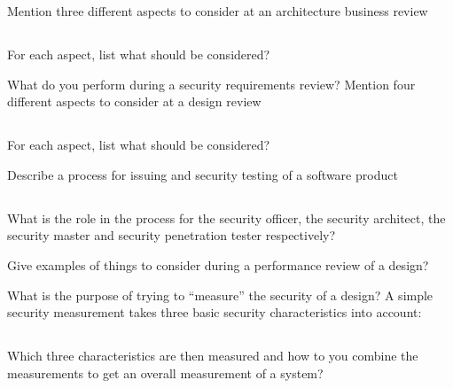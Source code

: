 \begin{questions}
\question{} Mention three different aspects to consider at an architecture business review
  \begin{parts}
  \part{} For each aspect, list what should be considered?
  \end{parts}

\question{} What do you perform during a security requirements review?
\question{} Mention four different aspects to consider at a design review
  \begin{parts}
  \part{} For each aspect, list what should be considered?
  \end{parts}

\question{} Describe a process for issuing and security testing of a software product
  \begin{parts}
  \part{} What is the role in the process for the security officer, the security architect, the security master and security penetration tester respectively?
  \end{parts}

\question{} Give examples of things to consider during a performance review of a design?

\question{} What is the purpose of trying to ``measure'' the security of a design?
\question{} A simple security measurement takes three basic security characteristics into account:
  \begin{parts}
  \part{} Which three characteristics are then measured and how to you combine the measurements to get an overall measurement of a system?
  \end{parts}


\end{questions}
